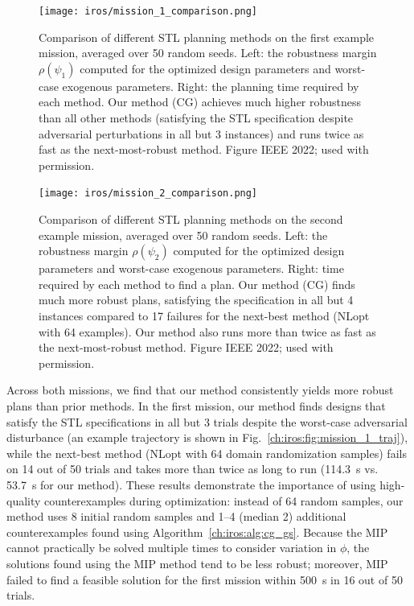 \begin{figure}[tbh]
	\centering
	\texttt{[image: iros/mission\_1\_comparison.png]}
	\caption{Comparison of different STL planning methods on the first example mission, averaged over 50 random seeds. Left: the robustness margin $\rho(\psi_1)$ computed for the optimized design parameters and worst-case exogenous parameters. Right: the planning time required by each method. Our method (CG) achieves much higher robustness than all other methods (satisfying the STL specification despite adversarial perturbations in all but 3 instances) and runs twice as fast as the next-most-robust method. Figure \textcopyright{} IEEE 2022; used with permission.}
	\label{ch:iros:fig:mission_1_comparison}
\end{figure}

\begin{figure}[tbh]
	\centering
	\texttt{[image: iros/mission\_2\_comparison.png]}
	\caption{Comparison of different STL planning methods on the second example mission, averaged over 50 random seeds. Left: the robustness margin $\rho(\psi_2)$ computed for the optimized design parameters and worst-case exogenous parameters. Right: time required by each method to find a plan. Our method (CG) finds much more robust plans, satisfying the specification in all but 4 instances compared to 17 failures for the next-best method (NLopt with 64 examples). Our method also runs more than twice as fast as the next-most-robust method. Figure \textcopyright{} IEEE 2022; used with permission.}
	\label{ch:iros:fig:mission_2_comparison}
\end{figure}

Across both missions, we find that our method consistently yields more robust plans than prior methods. In the first mission, our method finds designs that satisfy the STL specifications in all but 3 trials despite the worst-case adversarial disturbance (an example trajectory is shown in Fig.~\ref{ch:iros:fig:mission_1_traj}), while the next-best method (NLopt with 64 domain randomization samples) fails on 14 out of 50 trials and takes more than twice as long to run (\SI{114.3}{s} vs. \SI{53.7}{s} for our method). These results demonstrate the importance of using high-quality counterexamples during optimization: instead of 64 random samples, our method uses 8 initial random samples and 1--4 (median 2) additional counterexamples found using Algorithm~\ref{ch:iros:alg:cg_gs}. Because the MIP cannot practically be solved multiple times to consider variation in $\phi$, the solutions found using the MIP method tend to be less robust; moreover, MIP failed to find a feasible solution for the first mission within \SI{500}{s} in 16 out of 50 trials.

